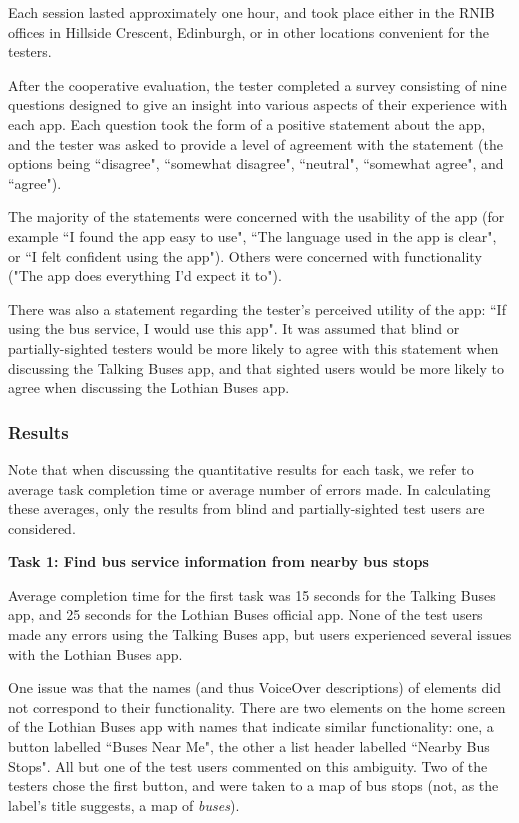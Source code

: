 \documentclass[10pt,twocolumn]{article}
\begin{document}
Each session lasted approximately one hour, and took place either in the RNIB offices in Hillside Crescent, Edinburgh, or in other locations convenient for the testers.

After the cooperative evaluation, the tester completed a survey consisting of nine questions designed to give an insight into various aspects of their experience with each app. Each question took the form of a positive statement about the app, and the tester was asked to provide a level of agreement with the statement (the options being ``disagree", ``somewhat disagree", ``neutral", ``somewhat agree", and ``agree").

The majority of the statements were concerned with the usability of the app (for example ``I found the app easy to use", ``The language used in the app is clear", or ``I felt confident using the app"). Others were concerned with functionality ("The app does everything I'd expect it to").

There was also a statement regarding the tester's perceived utility of the app: ``If using the bus service, I would use this app". It was assumed that blind or partially-sighted testers would be more likely to agree with this statement when discussing the Talking Buses app, and that sighted users would be more likely to agree when discussing the Lothian Buses app.

\subsubsection{Results}
Note that when discussing the quantitative results for each task, we refer to average task completion time or average number of errors made. In calculating these averages, only the results from blind and partially-sighted test users are considered. 

\textbf{Task 1: Find bus service information from nearby bus stops}

Average completion time for the first task was 15 seconds for the Talking Buses app, and 25 seconds for the Lothian Buses official app. None of the test users made any errors using the Talking Buses app, but users experienced several issues with the Lothian Buses app.

One issue was that the names (and thus VoiceOver descriptions) of elements did not correspond to their functionality. There are two elements on the home screen of the Lothian Buses app with names that indicate similar functionality: one, a button labelled ``Buses Near Me", the other a list header labelled ``Nearby Bus Stops". All but one of the test users commented on this ambiguity. Two of the testers chose the first button, and were taken to a map of bus stops (not, as the label's title suggests, a map of \textit{buses}).
\end{document}
